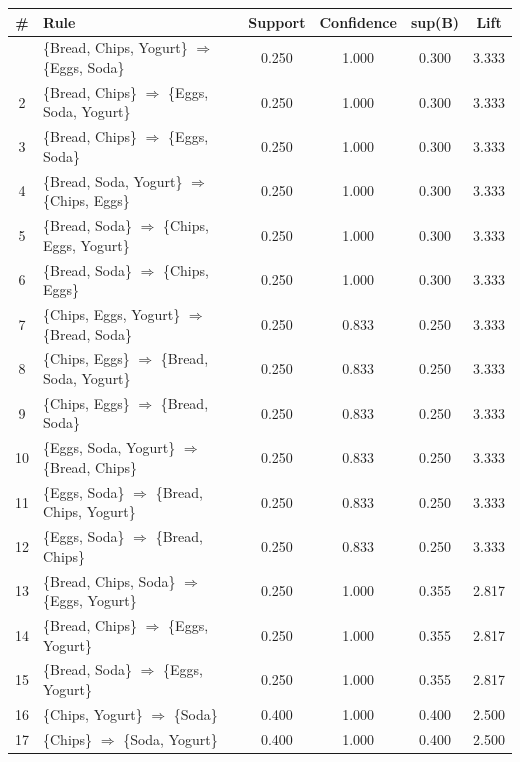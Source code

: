 \documentclass[12pt,letterpaper, onecolumn]{exam}
\begin{document}
\begin{questions}
\begin{solution}
        {\footnotesize
        \begin{longtable}{|c|l|c|c|c|c|}
            \hline \# & Rule & Support & Confidence & sup(B) & Lift \\ \hline
            \endhead
            \hline
            \endfoot
            1 & \{Bread, Chips, Yogurt\} $\Rightarrow$ \{Eggs, Soda\} & 0.250 & 1.000 & 0.300 & 3.333 \\
            2 & \{Bread, Chips\} $\Rightarrow$ \{Eggs, Soda, Yogurt\} & 0.250 & 1.000 & 0.300 & 3.333 \\
            3 & \{Bread, Chips\} $\Rightarrow$ \{Eggs, Soda\} & 0.250 & 1.000 & 0.300 & 3.333 \\
            4 & \{Bread, Soda, Yogurt\} $\Rightarrow$ \{Chips, Eggs\} & 0.250 & 1.000 & 0.300 & 3.333 \\
            5 & \{Bread, Soda\} $\Rightarrow$ \{Chips, Eggs, Yogurt\} & 0.250 & 1.000 & 0.300 & 3.333 \\
            6 & \{Bread, Soda\} $\Rightarrow$ \{Chips, Eggs\} & 0.250 & 1.000 & 0.300 & 3.333 \\
            7 & \{Chips, Eggs, Yogurt\} $\Rightarrow$ \{Bread, Soda\} & 0.250 & 0.833 & 0.250 & 3.333 \\
            8 & \{Chips, Eggs\} $\Rightarrow$ \{Bread, Soda, Yogurt\} & 0.250 & 0.833 & 0.250 & 3.333 \\
            9 & \{Chips, Eggs\} $\Rightarrow$ \{Bread, Soda\} & 0.250 & 0.833 & 0.250 & 3.333 \\
            10 & \{Eggs, Soda, Yogurt\} $\Rightarrow$ \{Bread, Chips\} & 0.250 & 0.833 & 0.250 & 3.333 \\
            11 & \{Eggs, Soda\} $\Rightarrow$ \{Bread, Chips, Yogurt\} & 0.250 & 0.833 & 0.250 & 3.333 \\
            12 & \{Eggs, Soda\} $\Rightarrow$ \{Bread, Chips\} & 0.250 & 0.833 & 0.250 & 3.333 \\
            13 & \{Bread, Chips, Soda\} $\Rightarrow$ \{Eggs, Yogurt\} & 0.250 & 1.000 & 0.355 & 2.817 \\
            14 & \{Bread, Chips\} $\Rightarrow$ \{Eggs, Yogurt\} & 0.250 & 1.000 & 0.355 & 2.817 \\
            15 & \{Bread, Soda\} $\Rightarrow$ \{Eggs, Yogurt\} & 0.250 & 1.000 & 0.355 & 2.817 \\
            16 & \{Chips, Yogurt\} $\Rightarrow$ \{Soda\} & 0.400 & 1.000 & 0.400 & 2.500 \\
            17 & \{Chips\} $\Rightarrow$ \{Soda, Yogurt\} & 0.400 & 1.000 & 0.400 & 2.500 \\

\end{longtable}}
\end{solution}
\end{questions}
\end{document}
